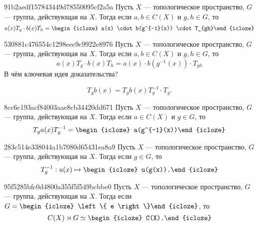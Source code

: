 \begin{note}{91b2aedf157843449d78550095cf2a5a}
    Пусть \({ X }\) --- топологическое пространство, \({ G }\) --- группа, действующая на \({ X }\).
    Тогда если \({ a, b \in C(X) }\) и \({ g, h \in G }\), то
    \[
        a(x)T_{g} \cdot b(x) T_{h} = \begin{icloze}{1}a(x) \cdot b(g^{-1}(x)) \cdot T_{gh}\end{icloze}
    \]
\end{note}

\begin{note}{530881c476554c1298eec9c9922e8976}
    Пусть \({ X }\) --- топологическое пространство, \({ G }\) --- группа, действующая на \({ X }\).
    Тогда если \({ a, b \in C(X) }\) и \({ g, h \in G }\), то
    \[
        a(x)T_{g} \cdot b(x) T_{h} = a(x) \cdot b(g^{-1}(x)) \cdot T_{gh}
    \]
    В чём ключевая идея доказательства?

    \begin{cloze}{1}
        \[
            T_{g} b(x) = T_{g} b(x) T_{g}^{-1} \cdot T_{g}.
        \]
    \end{cloze}
\end{note}

\begin{note}{8cc6c193acf84003aae8cb34420dd671}
    Пусть \({ X }\) --- топологическое пространство, \({ G }\) --- группа, действующая на \({ X }\).
    Тогда если \({ a \in C(X) }\) и \({ g \in G }\), то
    \[
        T_{g} a(x) T_{g}^{-1} = \begin{icloze}{1}a(g^{-1}(x))\end{icloze}
    \]
\end{note}

\begin{note}{283c514e338044a1b7080d65431ea8a9}
    Пусть \({ X }\) --- топологическое пространство, \({ G }\) --- группа, действующая на \({ X }\).
    Тогда если \({ g \in G }\), то
    \[
        T_{g}^{-1} : u(x) \mapsto \begin{icloze}{1}u(g(x)).\end{icloze}
    \]
\end{note}

\begin{note}{95f5285bfc0d4800a355f5f549bcbbe0}
    Пусть \({ X }\) --- топологическое пространство, \({ G }\) --- группа, действующая на \({ X }\).
    Тогда если \({ G = \begin{icloze}{2}\left\{ e \right\}\end{icloze} }\), то
    \[
        C(X) \rtimes G \simeq \begin{icloze}{1}C(X).\end{icloze}
    \]
\end{note}

